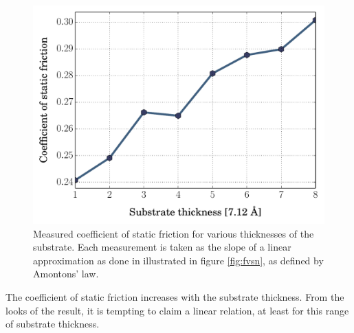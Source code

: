 \documentclass[twoside,english]{uiofysmaster}
\begin{document}



\begin{figure}
\centering
\hspace{-5mm}
\includegraphics[width=0.7\linewidth]{figures/friction/coefficientVsIndentation2}
\caption{Measured coefficient of static friction for various thicknesses of the substrate. 
	Each measurement is taken as the slope of a linear approximation as done in illustrated in figure \ref{fig:fvsn}, as defined by Amontons' law. }
\label{fig:coefficientVsIndentation2}
\end{figure}
The coefficient of static friction increases with the substrate thickness.
From the looks of the result, it is tempting to claim a linear relation, at least for this range of substrate thickness. 


 
\end{document}
